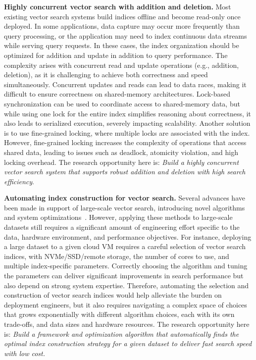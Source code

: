 \textbf{Highly concurrent vector search with addition and deletion.} Most existing vector search systems build indices offline and become read-only once deployed. In some applications, data capture may occur more frequently than query processing, or the application may need to index continuous data streams while serving query requests. In these cases, the index organization should be optimized for addition and update in addition to query performance. The complexity arises with concurrent read and update operations (e.g., addition, deletion), as it is challenging to achieve both correctness and speed simultaneously. Concurrent updates and reads can lead to data races, making it difficult to ensure correctness on shared-memory architectures. Lock-based synchronization can be used to coordinate access to shared-memory data, but while using one lock for the entire index simplifies reasoning about correctness, it also leads to serialized execution, severely impacting scalability. Another solution is to use fine-grained locking, where multiple locks are associated with the index. However, fine-grained locking increases the complexity of operations that access shared data, leading to issues such as deadlock, atomicity violation, and high locking overhead. The research opportunity here is: \emph{Build a highly concurrent vector search system that supports robust addition and deletion with high search efficiency}. 

\textbf{Automating index construction for vector search.} Several advances have been made in support of large-scale vector search, introducing novel algorithms and system optimizations~\cite{grip,diskann,hm-ann,spann}. However, applying these methods to large-scale datasets still requires a significant amount of engineering effort specific to the data, hardware environment, and performance objectives. For instance, deploying a large dataset to a given cloud VM requires a careful selection of vector search indices, with NVMe/SSD/remote storage, the number of cores to use, and multiple index-specific parameters. Correctly choosing the algorithm and tuning the parameters can deliver significant improvements in search performance but also depend on strong system expertise. Therefore, automating the selection and construction of vector search indices would help alleviate the burden on deployment engineers, but it also requires navigating a complex space of choices that grows exponentially with different algorithm choices, each with its own trade-offs, and data sizes and hardware resources. The research opportunity here is: \emph{Build a framework and optimization algorithm that automatically finds the optimal index construction strategy for a given dataset to deliver fast search speed with low cost.}

